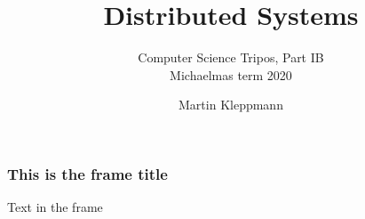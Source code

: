 \documentclass[17pt]{beamer}
\title{Distributed Systems}
\subtitle{Computer Science Tripos, Part IB\\Michaelmas term 2020}
\author{Martin Kleppmann}
\institute{Department of Computer Science and Technology\\University of Cambridge}
\date{}
\begin{document}
\frame{\titlepage}

\begin{frame}
\frametitle{This is the frame title}
Text in the frame
\end{frame}
\end{document}
